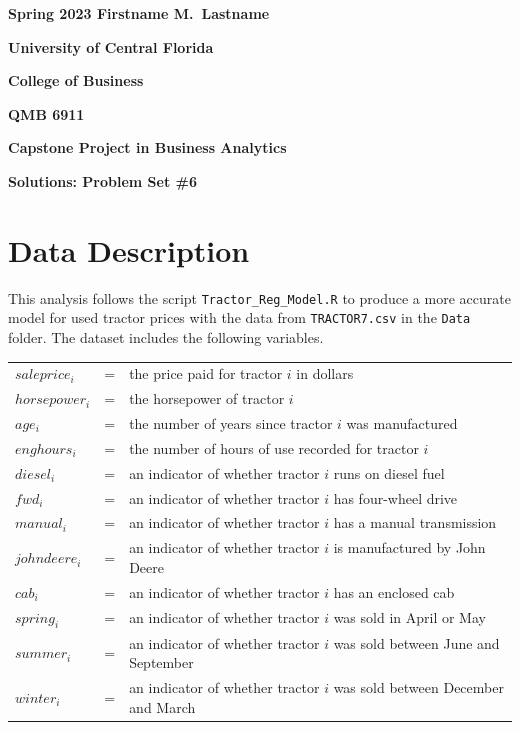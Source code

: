 \documentclass[11pt]{paper}
\begin{document}

\pagestyle{empty}
{\noindent\bf Spring 2023 \hfill Firstname M.~Lastname}
\vskip 16pt
\centerline{\bf University of Central Florida}
\centerline{\bf College of Business}
\vskip 16pt
\centerline{\bf QMB 6911}
\centerline{\bf Capstone Project in Business Analytics}
\vskip 10pt
\centerline{\bf Solutions:  Problem Set \#6}
\vskip 32pt
\noindent

\section{Data Description}

This analysis follows the script \texttt{Tractor\_Reg\_Model.R} to produce a more accurate model for used tractor prices with the data from \texttt{TRACTOR7.csv} in the \texttt{Data} folder. 
The dataset includes the following variables.
\begin{table}[h!]
\begin{tabular}{l l l}

$saleprice_i$ & = & the price paid for tractor $i$ in dollars \\
% 
$horsepower_i$ & = & the horsepower of tractor $i$ \\
$age_i$ & = & the number of years since tractor $i$ was manufactured  \\
$enghours_i$ & = & the number of hours of use recorded for tractor $i$  \\
$diesel_i$ & = & an indicator of whether tractor $i$ runs on diesel fuel \\ %
$fwd_i$ & = & an indicator of whether tractor $i$ has four-wheel drive \\ %
$manual_i$ & = & an indicator of whether tractor $i$ has a manual transmission \\ %
$johndeere_i$ & = & an indicator of whether tractor $i$ is manufactured by John Deere \\ %
$cab_i$ & = & an indicator of whether tractor $i$ has an enclosed cab \\ %
% 
$spring_i$ & = & an indicator of whether tractor $i$ was sold in April or May \\ %
$summer_i$ & = & an indicator of whether tractor $i$ was sold between June and September \\ %
$winter_i$ & = & an indicator of whether tractor $i$ was sold between December and March \\ %

\end{tabular}
\end{table}
%
\end{document}
